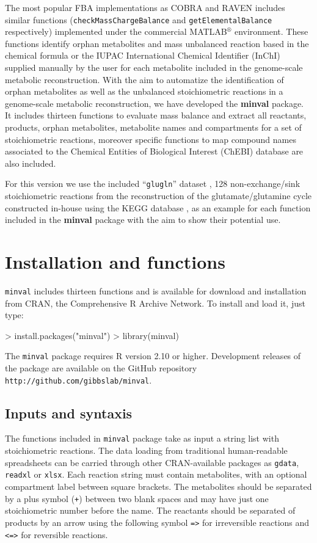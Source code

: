 The most popular FBA implementations as COBRA and RAVEN includes similar functions (\texttt{checkMassChargeBalance} and \texttt{getElementalBalance} respectively) implemented under the commercial MATLAB$^{\circledR}$ environment. These functions identify orphan metabolites and mass unbalanced reaction based in the chemical formula or the IUPAC International Chemical Identifier (InChI) supplied manually by the user for each metabolite included in the genome-scale metabolic reconstruction. With the aim to automatize the identification of orphan metabolites as well as the unbalanced stoichiometric reactions in a genome-scale metabolic reconstruction, we have developed the \textbf{minval} package. It includes thirteen functions to evaluate mass balance and extract all reactants, products, orphan metabolites, metabolite names and compartments for a set of stoichiometric reactions, moreover specific functions to map compound names associated to the Chemical Entities of Biological Interest (ChEBI) database are also included.

For this version we use the included ``\texttt{glugln}'' dataset \cite{NelsonE.2015}, 128 non-exchange/sink stoichiometric reactions from the reconstruction of the glutamate/glutamine cycle constructed in-house using the KEGG database , as an example for each function included in the \textbf{minval} package with the aim to show their potential use.
\section{Installation and functions}
\texttt{minval} includes thirteen functions and is available for download and installation from CRAN, the
Comprehensive R Archive Network. To install and load it, just type:
\begin{Schunk}
\begin{Sinput}
> install.packages("minval")
> library(minval)
\end{Sinput}
\end{Schunk}
The \texttt{minval} package requires R version 2.10 or higher. Development releases of the package are available on the GitHub repository \texttt{http://github.com/gibbslab/minval}.
\subsection*{Inputs and syntaxis}
The functions included in \texttt{minval} package take as input a string list with stoichiometric reactions. The data loading from traditional human-readable spreadsheets can be carried through other CRAN-available packages as \texttt{gdata}, \texttt{readxl} or \texttt{xlsx}. Each reaction string must contain metabolites, with an optional compartment label between square brackets. The metabolites should be separated by a plus symbol (\texttt{+}) between two blank spaces and may have just one stoichiometric number before the name. The reactants should be separated of products by an arrow using the following symbol \texttt{=>} for irreversible reactions and \texttt{<=>} for reversible reactions.
